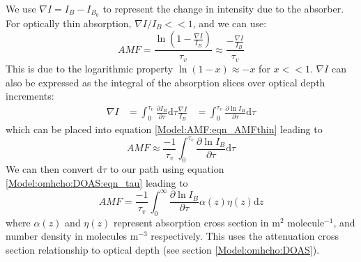   We use $\nabla I = I_B - I_{B_0}$ to represent the change in intensity due to the absorber. 
  For optically thin absorption, $\nabla I / I_B << 1$, and we can use:
  \begin{equation} \label{Model:AMF:eqn_AMFthin}
    AMF = \frac{\ln{ \left( 1 - \frac{\nabla I}{I_B} \right)} }{\tau_v} \approx \frac{ - \frac{\nabla I}{I_B} }{\tau_v}
  \end{equation}
  This is due to the logarithmic property $\ln \left(1-x \right) \approx -x$ for $x<<1$.
  $\nabla I$ can also be expressed as the integral of the absorption slices over optical depth increments: 
  \begin{eqnarray*}
    \nabla I &= \int_0^{\tau_v}{\frac{\partial I_B}{\partial \tau} \mathrm{d}\tau}
    \frac{\nabla I}{I_B} & = \int_0^{\tau_v}{\frac{\partial \ln{I_B}}{\partial \tau} \mathrm{d}\tau}
  \end{eqnarray*}
  which can be placed into equation \ref{Model:AMF:eqn_AMFthin} leading to
  \begin{equation*}
    AMF \approx \frac{-1}{\tau_v} \int_0^{\tau_v}{\frac{\partial \ln{I_B}}{\partial \tau} \mathrm{d}\tau}
  \end{equation*}
  We can then convert $\text{d}\tau$ to our path using equation \ref{Model:omhcho:DOAS:eqn_tau} leading to
  \begin{equation} \label{Model:AMF:eqn_AMFcross}
    AMF = \frac{-1}{\tau_v} \int_0^\infty {\frac{\partial \ln{I_B}}{\partial \tau} \alpha(z)\eta(z)\mathrm{d}z}
  \end{equation}
  where $\alpha(z)$ and $\eta(z)$ represent absorption cross section in m$^2$ molecule$^{-1}$, and number density in molecules m$^{-3}$ respectively. 
  This uses the attenuation cross section relationship to optical depth (see section \ref{Model:omhcho:DOAS}).
  
